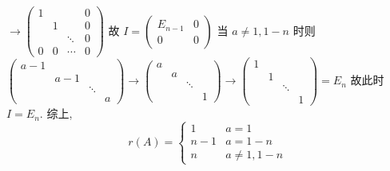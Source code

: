 		 $\to \begin{pmatrix}
				 1 &   &        & 0 \\
				   & 1 &        & 0 \\
				   &   & \ddots & 0 \\
				 0 & 0 & \cdots & 0
			 \end{pmatrix}$ 故 $I = \begin{pmatrix}
				 E_{n-1} & 0 \\
				 0       & 0
			 \end{pmatrix}$
		 当 $a \neq 1, 1-n$ 时则 $\begin{pmatrix}
				 a-1 &     &        &   \\
				     & a-1 &        &   \\
				     &     & \ddots &   \\
				     &     &        & a
			 \end{pmatrix} \to \begin{pmatrix}
				 a &   &        &   \\
				   & a &        &   \\
				   &   & \ddots &   \\
				   &   &        & 1
			 \end{pmatrix} \to \begin{pmatrix}
				 1 &   &        &   \\
				   & 1 &        &   \\
				   &   & \ddots &   \\
				   &   &        & 1
			 \end{pmatrix} = E_n$
		 故此时 $I = E_n$. 综上,
		 \[r(A) = \begin{cases}
				 1   & a=1           \\
				 n-1 & a=1-n         \\
				 n   & a \neq 1, 1-n
			 \end{cases}\]


